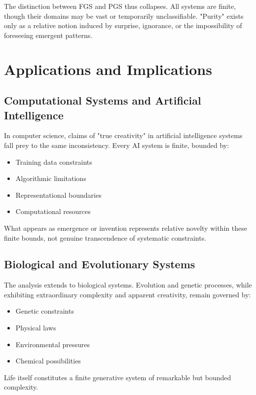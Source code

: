 \documentclass[11pt,a4paper]{article}
\begin{document}
    The distinction between FGS and PGS thus collapses. All systems are finite, though their domains may be vast or temporarily unclassifiable. "Purity" exists only as a relative notion induced by surprise, ignorance, or the impossibility of foreseeing emergent patterns.

    \section{Applications and Implications}

    \subsection{Computational Systems and Artificial Intelligence}

    In computer science, claims of "true creativity" in artificial intelligence systems fall prey to the same inconsistency. Every AI system is finite, bounded by:
    \begin{itemize}
        \item Training data constraints
        \item Algorithmic limitations
        \item Representational boundaries
        \item Computational resources
    \end{itemize}

    What appears as emergence or invention represents relative novelty within these finite bounds, not genuine transcendence of systematic constraints.

    \subsection{Biological and Evolutionary Systems}

    The analysis extends to biological systems. Evolution and genetic processes, while exhibiting extraordinary complexity and apparent creativity, remain governed by:
    \begin{itemize}
        \item Genetic constraints
        \item Physical laws
        \item Environmental pressures
        \item Chemical possibilities
    \end{itemize}

    Life itself constitutes a finite generative system of remarkable but bounded complexity.
\end{document}
